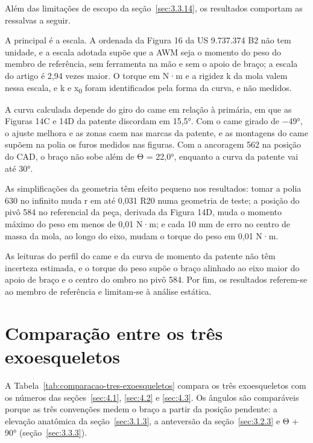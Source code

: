 Além das limitações de escopo da seção~\ref{sec:3.3.14}, os resultados comportam as ressalvas a seguir.

A principal é a escala. A ordenada da Figura 16 da US 9.737.374 B2 não tem unidade, e a escala adotada supõe que a AWM seja o momento do peso do membro de referência, sem ferramenta na mão e sem o apoio de braço; a escala do artigo é 2,94 vezes maior. O torque em N·m e a rigidez k da mola valem nessa escala, e k e x\textsubscript{0} foram identificados pela forma da curva, e não medidos.

A curva calculada depende do giro do came em relação à primária, em que as Figuras 14C e 14D da patente discordam em 15,5°. Com o came girado de −49°, o ajuste melhora e as zonas caem nas marcas da patente, e as montagens do came supõem na polia os furos medidos nas figuras. Com a ancoragem 562 na posição do CAD, o braço não sobe além de Θ = 22,0°, enquanto a curva da patente vai até 30°.

As simplificações da geometria têm efeito pequeno nos resultados: tomar a polia 630 no infinito muda r em até 0,031 R20 numa geometria de teste; a posição do pivô 584 no referencial da peça, derivada da Figura 14D, muda o momento máximo do peso em menos de 0,01 N·m; e cada 10 mm de erro no centro de massa da mola, ao longo do eixo, mudam o torque do peso em 0,01 N·m.

As leituras do perfil do came e da curva de momento da patente não têm incerteza estimada, e o torque do peso supõe o braço alinhado ao eixo maior do apoio de braço e o centro do ombro no pivô 584. Por fim, os resultados referem-se ao membro de referência e limitam-se à análise estática.

\section{Comparação entre os três exoesqueletos}\label{sec:4.4}

A Tabela~\ref{tab:comparacao-tres-exoesqueletos} compara os três exoesqueletos com os números das seções~\ref{sec:4.1}, \ref{sec:4.2} e \ref{sec:4.3}. Os ângulos são comparáveis porque as três convenções medem o braço a partir da posição pendente: a elevação anatômica da seção~\ref{sec:3.1.3}, a anteversão da seção~\ref{sec:3.2.3} e Θ + 90° (seção~\ref{sec:3.3.3}).

